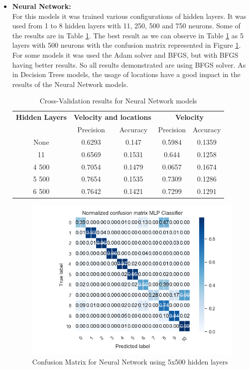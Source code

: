 \begin{itemize}
\newpage
\item \textbf{Neural Network: }\\
For this models it was trained various configurations of hidden layers. It was used from 1 to 8 hidden layers with 11, 250, 500 and 750 neurons. Some of the results are in Table \ref{table:cross_val_nn}. The best result as we can observe in Table \ref{table:cross_val_nn} as 5 layers with 500 neurons with the confusion matrix represented in Figure \ref{fig:cm_nn}.
For some models it was used the Adam solver and BFGS, but with BFGS having better results. So all results demonstrated are using BFGS solver.
As in Decision Trees models, the usage of locations have a good impact in the results of the Neural Network models.


\begin {table}[H]
\begin{center}
\begin{tabular}{c|c|c|c|c}
\multicolumn{1}{c|}{\textbf{Hidden Layers } }   &\multicolumn{2}{c|}{\textbf{ Velocity and locations}}& \multicolumn{2}{c}{\textbf{ Velocity}}\\
&Precision & Accuracy & Precision & Accuracy \\
\hline
None &0.6293&0.147   &0.5984 &0.1359\\
11   & 0.6569&0.1531   &0.644 &0.1258\\
4 500 &0.7054&0.1479  & 0.0657 & 0.1674\\
5 500 & 0.7654&0.1535 &0.7309 & 0.1286\\
6 500 &0.7642 &0.1421 &0.7299 &0.1291 
\label{table:cross_val_nn}
\end{tabular}
\caption {Cross-Validation results for Neural Network models}
\end{center}
\end {table}


\begin{figure}[h]
    \centering
    \includegraphics[width=0.8\linewidth]{Chapters/img/CM_NN.png}
    \caption{Confusion Matrix for Neural Network using 5x500 hidden layers}
    \label{fig:cm_nn}
\end{figure}



\end{itemize}
